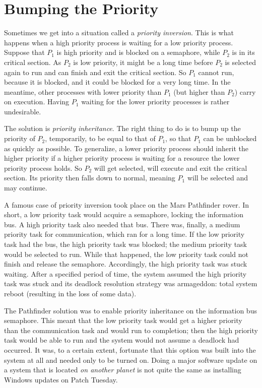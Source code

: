 \section*{Bumping the Priority}
Sometimes we get into a situation called a \textit{priority inversion}. This is what happens when a high priority process is waiting for a low priority process. Suppose that $P_{1}$ is high priority and is blocked on a semaphore, while $P_{2}$ is in its critical section. As $P_{2}$ is low priority, it might be a long time before $P_{2}$ is selected again to run and can finish and exit the critical section. So $P_{1}$ cannot run, because it is blocked, and it could be blocked for a very long time. In the meantime, other processes with lower priority than $P_{1}$ (but higher than $P_{2}$) carry on execution. Having $P_{1}$ waiting for the lower priority processes is rather undesirable.

The solution is \textit{priority inheritance}. The right thing to do is to bump up the priority of $P_{2}$, temporarily, to be equal to that of $P_{1}$, so that $P_{1}$ can be unblocked as quickly as possible. To generalize, a lower priority process should inherit the higher priority if a higher priority process is waiting for a resource the lower priority process holds. So $P_{2}$ will get selected, will execute and exit the critical section. Its priority then falls down to normal, meaning $P_{1}$ will be selected and may continue.

A famous case of priority inversion took place on the Mars Pathfinder rover. In short, a low priority task would acquire a semaphore, locking the information bus. A high priority task also needed that bus. There was, finally, a medium priority task for communication, which ran for a long time. If the low priority task had the bus, the high priority task was blocked; the medium priority task would be selected to run. While that happened, the low priority task could not finish and release the semaphore. Accordingly, the high priority task was stuck waiting. After a specified period of time, the system assumed the high priority task was stuck and its deadlock resolution strategy was armageddon: total system reboot (resulting in the loss of some data). 

The Pathfinder solution was to enable priority inheritance on the information bus semaphore. This meant that the low priority task would get a higher priority than the communication task and would run to completion; then the high priority task would be able to run and the system would not assume a deadlock had occurred. It was, to a certain extent, fortunate that this option was built into the system at all and needed only to be turned on. Doing a major software update on a system that is located \textit{on another planet} is not quite the same as installing Windows updates on Patch Tuesday.



